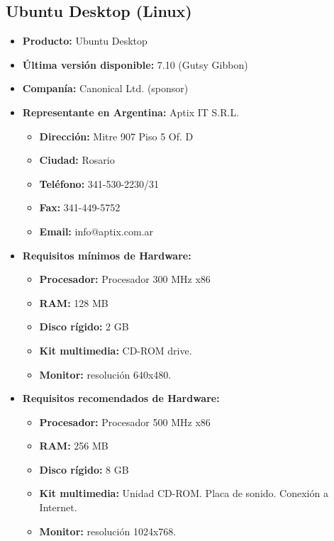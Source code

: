 \subsection{Ubuntu Desktop (Linux)}

\begin{itemize}
  \item \textbf{Producto:} Ubuntu Desktop
  \item \textbf{Última versión disponible:} 7.10 (Gutsy Gibbon)
  \item \textbf{Companía:} Canonical Ltd. (sponsor)

  \item \textbf{Representante en Argentina:} Aptix IT S.R.L.
    \begin{itemize}
      \item \textbf{Dirección:} Mitre 907 Piso 5 Of. D
      \item \textbf{Ciudad:} Rosario
      \item \textbf{Teléfono:} 341-530-2230/31
      \item \textbf{Fax:} 341-449-5752
      \item \textbf{Email:} info@aptix.com.ar
    \end{itemize}

  \item \textbf{Requisitos mínimos de Hardware:}
    \begin{itemize}
      \item \textbf{Procesador:} Procesador 300 MHz x86
      \item \textbf{RAM:} 128 MB
      \item \textbf{Disco rígido:} 2 GB
      \item \textbf{Kit multimedia:} CD-ROM drive.
      \item \textbf{Monitor:} resolución 640x480.
    \end{itemize}

  \item \textbf{Requisitos recomendados de Hardware:}
    \begin{itemize}
      \item \textbf{Procesador:} Procesador 500 MHz x86
      \item \textbf{RAM:} 256 MB
      \item \textbf{Disco rígido:} 8 GB
      \item \textbf{Kit multimedia:} Unidad CD-ROM. Placa de sonido. Conexión a Internet.
      \item \textbf{Monitor:} resolución 1024x768.
    \end{itemize}


\end{itemize}
